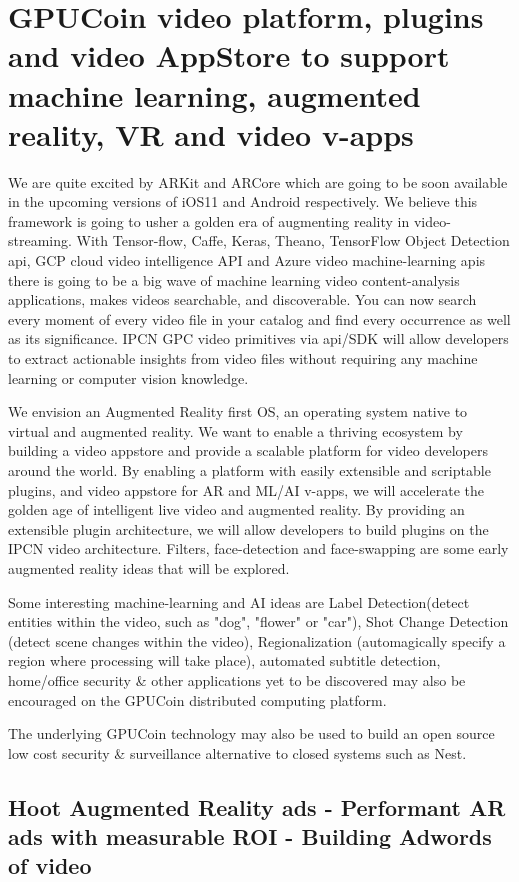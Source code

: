 \documentclass{article}
\begin{document}
\section{GPUCoin video platform, plugins and video AppStore to support machine learning, augmented reality, VR and video v-apps}
We are quite excited by ARKit and ARCore which are going to be soon available in the upcoming versions of iOS11 and Android respectively. We believe this framework is going to usher a golden era of augmenting reality in video-streaming. With Tensor-flow, Caffe, Keras, Theano, TensorFlow Object Detection api, GCP cloud video intelligence API and Azure video machine-learning apis there is going to be a big wave of machine learning video content-analysis applications, makes videos searchable, and discoverable. You can now search every moment of every video file in your catalog and find every occurrence as well as its significance. IPCN GPC video primitives via api/SDK will allow developers to extract actionable insights from video files without requiring any machine learning or computer vision knowledge. 

We envision an Augmented Reality first OS, an operating system native to virtual and augmented reality. We want to enable a thriving ecosystem by building a video appstore and provide a scalable platform for video developers around the world. By enabling a platform with easily extensible and scriptable plugins, and video appstore for AR and ML/AI v-apps, we will accelerate the golden age of intelligent live video and augmented reality. By providing an extensible plugin architecture, we will allow developers to build plugins on the IPCN video architecture. Filters, face-detection and face-swapping are some early augmented reality ideas that will be explored.

Some interesting machine-learning and AI ideas are Label Detection(detect entities within the video, such as "dog", "flower" or "car"), Shot Change Detection (detect scene changes within the video), Regionalization (automagically specify a region where processing will take place), automated subtitle detection, home/office security \& other applications yet to be discovered may also be encouraged on the GPUCoin distributed computing platform.

The underlying GPUCoin technology may also be used to build an open source low cost security \& surveillance alternative to closed systems such as Nest.
\subsection{Hoot Augmented Reality ads - Performant AR ads with measurable ROI - Building Adwords of video }
\end{document}
